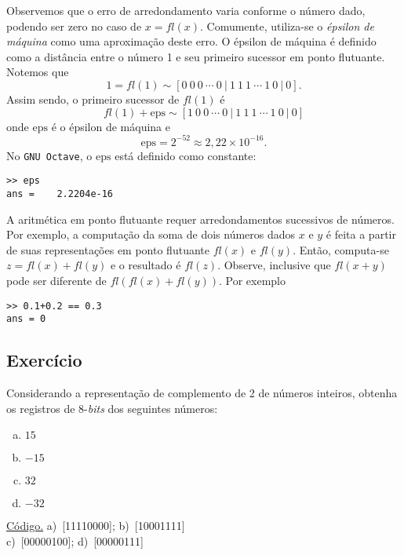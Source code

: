 Observemos que o erro de arredondamento varia conforme o número dado, podendo ser zero no caso de $x = fl(x)$. Comumente, utiliza-se o \emph{épsilon de máquina} como uma aproximação deste erro. O épsilon de máquina é definido como a distância entre o número 1 e seu primeiro sucessor em ponto flutuante. Notemos que
\begin{equation}
  1 = fl(1) \sim [0 ~ 0 ~ 0 ~ \cdots ~ 0 ~ | ~ 1 ~ 1 ~ 1 ~ \cdots ~ 1 ~ 0 ~ | ~ 0].
\end{equation}
Assim sendo, o primeiro sucessor de $fl(1)$ é
\begin{equation}
  fl(1)+\mathrm{eps} \sim [1 ~ 0 ~ 0 ~ \cdots ~ 0 ~ | ~ 1 ~ 1 ~ 1 ~ \cdots ~ 1 ~ 0 ~ | ~ 0]
\end{equation}
onde $\mathrm{eps}$ é o épsilon de máquina e
\begin{equation}
  \mathrm{eps} = 2^{-52} \approx 2,22\times 10^{-16}.
\end{equation}
\ifisoctave
No \verb+GNU Octave+, o $\mathrm{eps}$ está definido como constante:
\begin{verbatim}
>> eps
ans =    2.2204e-16
\end{verbatim}
\fi

A aritmética em ponto flutuante requer arredondamentos sucessivos de números. Por exemplo, a computação da soma de dois números dados $x$ e $y$ é feita a partir de suas representações em ponto flutuante $fl(x)$ e $fl(y)$. Então, computa-se $z = fl(x)+fl(y)$ e o resultado é $fl(z)$. Observe, inclusive que $fl(x+y)$ pode ser diferente de $fl(fl(x)+fl(y))$. Por exemplo
\ifisoctave
\begin{verbatim}
>> 0.1+0.2 == 0.3
ans = 0
\end{verbatim}
\fi

\subsection*{Exercício}

\begin{exer}
  Considerando a representação de complemento de 2 de números inteiros, obtenha os registros de $8$-{\it bits} dos seguintes números:
  \begin{enumerate}[a)]
  \item $15$
  \item $-15$
  \item $32$
  \item $-32$
  \end{enumerate}
\end{exer}
\begin{resp}
     \ifisoctave 
    \href{https://github.com/phkonzen/notas/blob/master/src/MatematicaNumerica/cap_aritm/dados/exer_int8/exer_int8.m}{Código.} 
    \fi
    a)~[11110000]; b)~[10001111]\\
    c)~[00000100]; d)~[00000111]
\end{resp}

